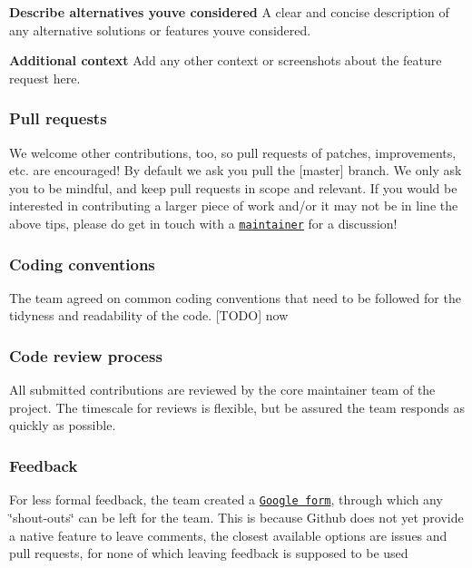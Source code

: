 {\bfseries Describe alternatives you\textquotesingle{}ve considered} A clear and concise description of any alternative solutions or features you\textquotesingle{}ve considered.

{\bfseries Additional context} Add any other context or screenshots about the feature request here.

\subsubsection*{Pull requests}

We welcome other contributions, too, so pull requests of patches, improvements, etc. are encouraged! By default we ask you pull the \mbox{[}master\mbox{]} branch. We only ask you to be mindful, and keep pull requests in scope and relevant. If you would be interested in contributing a larger piece of work and/or it may not be in line the above tips, please do get in touch with a \href{https://github.com/itsBelinda/ENG5220-2020-Team13/blob/master/README.md#credits}{\tt maintainer} for a discussion!

\subsubsection*{Coding conventions}

The team agreed on common coding conventions that need to be followed for the tidyness and readability of the code. \mbox{[}T\+O\+DO\mbox{]} now

\subsubsection*{Code review process}

All submitted contributions are reviewed by the core maintainer team of the project. The timescale for reviews is flexible, but be assured the team responds as quickly as possible.

\subsubsection*{Feedback}

For less formal feedback, the team created a \href{https://forms.gle/tGHM2jB7GBWfdgk3A}{\tt Google form}, through which any \char`\"{}shout-\/outs\char`\"{} can be left for the team. This is because Github does not yet provide a native feature to leave comments, the closest available options are issues and pull requests, for none of which leaving feedback is supposed to be used 